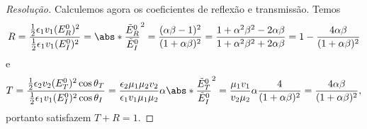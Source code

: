 \begin{proof}[Resolução]
    Calculemos agora os coeficientes de reflexão e transmissão. Temos
    \begin{equation*}
        R = \frac{\frac12 \epsilon_1 v_1 (E_R^0)^2}{\frac12 \epsilon_1 v_1 (E_I^0)^2} = \abs*{\frac{\tilde{E}_R^0}{\tilde{E}_I^0}}^2 = \frac{(\alpha \beta - 1)^2}{(1 + \alpha\beta)^2} = \frac{1 + \alpha^2\beta^2 - 2 \alpha \beta}{1 + \alpha^2\beta^2 + 2 \alpha \beta} = 1 -  \frac{4 \alpha \beta}{(1 + \alpha \beta)^2}
    \end{equation*}
    e
    \begin{equation*}
        T = \frac{\frac12 \epsilon_2 v_2 (E_T^0)^2 \cos\theta_T}{\frac12 \epsilon_1 v_1 (E_I^0)^2\cos\theta_I} = \frac{\epsilon_2 \mu_1 \mu_2 v_2}{\epsilon_1 v_1 \mu_1 \mu_2}\alpha\abs*{\frac{\tilde{E}_T^0}{\tilde{E}_I^0}}^2 = \frac{\mu_1 v_1}{v_2 \mu_2} \alpha \frac{4}{(1 + \alpha \beta)^2} = \frac{4 \alpha \beta}{(1 + \alpha \beta)^2},
    \end{equation*}
    portanto satisfazem \(T + R = 1\).
\end{proof}
